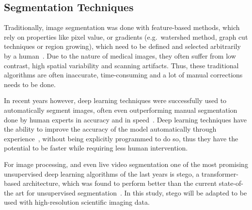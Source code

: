 \subsection{Segmentation Techniques} \label{subsec:problems-in-segmentation}
Traditionally, image segmentation was done with feature-based methods, which rely on properties like pixel value, or gradients (e.g.~watershed method, graph cut techniques or region growing), which need to be defined and selected arbitrarily by a human~\autocite{Kar2021}.
Due to the nature of medical images, they often suffer from low contrast, high spatial variability and scanning artifacts.
Thus, these traditional algorithms are often inaccurate, time-consuming and a lot of manual corrections needs to be done.

In recent years however, deep learning techniques were successfully used to automatically segment images, often even outperforming manual segmentation done by human experts in accuracy and in speed~\autocite{Antonelli2022}.
Deep learning techniques have the ability to improve the accuracy of the model automatically through experience~\autocite{Mitchell1997}, without being explicitly programmed to do so, thus they have the potential to be faster while requiring less human intervention.

For image processing, and even live video segmentation one of the most promising unsupervised deep learning algorithms of the last years is \gls{stego}, a transformer-based architecture, which was found to perform better than the current state-of-the art for unsupervised segmentation~\autocite{Hamilton2022}.
In this study, \gls{stego} will be adapted to be used with high-resolution scientific imaging data.
